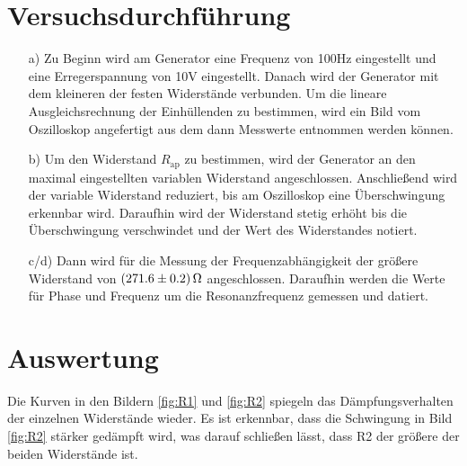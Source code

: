 \section{Versuchsdurchführung}\justifying

 \begin{enumerate}

    \item[a)] \justifying Zu Beginn wird am Generator eine Frequenz von 100Hz 
    eingestellt und eine Erregerspannung von 10V eingestellt. Danach wird der 
    Generator mit dem kleineren der festen Widerstände verbunden.
    Um die lineare Ausgleichsrechnung der Einhüllenden zu bestimmen, wird
    ein Bild vom Oszilloskop angefertigt aus dem dann Messwerte entnommen werden
    können.

    \item[b)] \justifying Um den Widerstand $R_{\text{ap}}$ zu bestimmen, wird der Generator 
    an den maximal eingestellten variablen Widerstand angeschlossen. Anschließend wird 
    der variable Widerstand reduziert, bis am Oszilloskop eine Überschwingung erkennbar 
    wird. Daraufhin wird der Widerstand stetig erhöht bis die Überschwingung verschwindet 
    und der Wert des Widerstandes notiert.
  
    \item[c/d)] \justifying Dann wird für die Messung der Frequenzabhängigkeit
                          der größere Widerstand von $\SI{271.6\pm 0.2}{\ohm}$ angeschlossen.
                          Daraufhin werden die Werte für Phase und Frequenz um die 
                          Resonanzfrequenz gemessen und datiert.
 \end{enumerate}
 \newpage

\section{Auswertung}\justifying


  Die Kurven in den Bildern \ref{fig:R1} und \ref{fig:R2} spiegeln das Dämpfungsverhalten der einzelnen Widerstände wieder. 
  Es ist erkennbar, dass die Schwingung in Bild \ref{fig:R2} stärker gedämpft wird, was darauf schließen lässt, dass R2 der 
  größere der beiden Widerstände ist.


